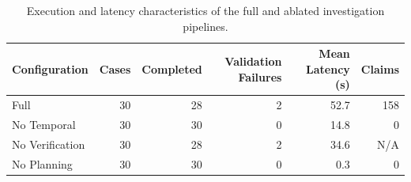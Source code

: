 \begin{table}[!t]
\centering
\caption{Execution and latency characteristics of the full and ablated investigation pipelines.}
\label{tab:runtime}
\begin{tabular}{lrrrrr}
\toprule
Configuration & Cases & Completed & Validation Failures & Mean Latency (s) & Claims \\
\midrule
Full & 30 & 28 & 2 & 52.7 & 158 \\
No Temporal & 30 & 30 & 0 & 14.8 & 0 \\
No Verification & 30 & 28 & 2 & 34.6 & N/A \\
No Planning & 30 & 30 & 0 & 0.3 & 0 \\
\bottomrule
\end{tabular}
\end{table}

